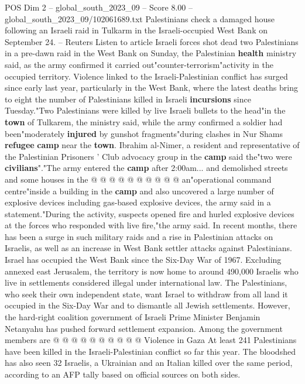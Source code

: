 \begin{textsample}{POS Dim 2 – global\_south\_2023\_09 – Score 8.00 – global\_south\_2023\_09/102061689.txt}  \label{ex:f2_pos_444}
Palestinians check a damaged house following an Israeli raid in Tulkarm in the Israeli-occupied West Bank on September 24. -- Reuters Listen to article Israeli forces shot dead two Palestinians in a pre-dawn raid in the West Bank on Sunday, the Palestinian \textbf{health} ministry said, as the army confirmed it carried out"counter-terrorism"activity in the occupied territory.
Violence linked to the Israeli-Palestinian conflict has surged since early last year, particularly in the West Bank, where the latest deaths bring to eight the number of Palestinians killed in Israeli \textbf{incursions} since Tuesday."Two Palestinians were killed by live Israeli bullets to the head"in the \textbf{town} of Tulkarem, the ministry said, while the army confirmed a soldier had been"moderately \textbf{injured} by gunshot fragments"during clashes in Nur Shams \textbf{refugee} \textbf{camp} near the \textbf{town}.
Ibrahim al-Nimer, a resident and representative of the Palestinian Prisoners ' Club advocacy group in the \textbf{camp} said the"two were \textbf{civilians}"."The army entered the \textbf{camp} after 2:00am... and demolished streets and some houses in the @ @ @ @ @ @ @ @ @ @ an"operational command centre"inside a building in the \textbf{camp} and also uncovered a large number of explosive devices including gas-based explosive devices, the army said in a statement."During the activity, suspects opened fire and hurled explosive devices at the forces who responded with live fire,"the army said.
In recent months, there has been a surge in such military raids and a rise in Palestinian attacks on Israelis, as well as an increase in West Bank settler attacks against Palestinians.
Israel has occupied the West Bank since the Six-Day War of 1967.
Excluding annexed east Jerusalem, the territory is now home to around 490,000 Israelis who live in settlements considered illegal under international law.
The Palestinians, who seek their own independent state, want Israel to withdraw from all land it occupied in the Six-Day War and to dismantle all Jewish settlements.
However, the hard-right coalition government of Israeli Prime Minister Benjamin Netanyahu has pushed forward settlement expansion.
Among the government members are @ @ @ @ @ @ @ @ @ @ Violence in Gaza At least 241 Palestinians have been killed in the Israeli-Palestinian conflict so far this year.
The bloodshed has also seen 32 Israelis, a Ukrainian and an Italian killed over the same period, according to an AFP tally based on official sources on both sides.

\end{textsample}
